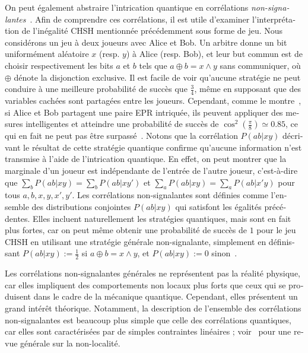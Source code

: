 \begin{otherlanguage}{french}
On peut également abstraire l'intrication quantique en corrélations \emph{non-signalantes}~\cite{Tsirelson80,PR94}. Afin de comprendre ces corrélations, il est utile d'examiner l'interprétation de l'inégalité CHSH mentionnée précédemment sous forme de jeu. Nous considérons un jeu à deux joueurs avec Alice et Bob. Un arbitre donne un bit uniformément aléatoire $x$ (resp. $y$) à Alice (resp. Bob), et leur but commun est de choisir respectivement les bits $a$ et $b$ tels que $a \oplus b = x \land y$ sans communiquer, où $\oplus$ dénote la disjonction exclusive. Il est facile de voir qu'aucune stratégie ne peut conduire à une meilleure probabilité de succès que $\frac{3}{4}$, même en supposant que des variables cachées sont partagées entre les joueurs. Cependant, comme le montre~\cite{CHSH69}, si Alice et Bob partagent une paire EPR intriquée, ils peuvent appliquer des mesures intelligentes et atteindre une probabilité de succès de $\cos^2\left(\frac{\pi}{8}\right) \simeq 0.85$, ce qui en fait ne peut pas être surpassé~\cite{Tsirelson80}. Notons que la corrélation $P(ab|xy)$ décrivant le résultat de cette stratégie quantique confirme qu'aucune information n'est transmise à l'aide de l'intrication quantique. En effet, on peut montrer que la marginale d'un joueur est indépendante de l'entrée de l'autre joueur, c'est-à-dire que $\sum_bP(ab|xy)=\sum_bP(ab|xy')$ et $\sum_aP(ab|xy)=\sum_aP(ab|x'y)$ pour tous $a,b,x,y,x',y'$. Les corrélations non-signalantes sont définies comme l'ensemble des distributions conjointes $P(ab|xy)$ qui satisfont les égalités précédentes. Elles incluent naturellement les stratégies quantiques, mais sont en fait plus fortes, car on peut même obtenir une probabilité de succès de $1$ pour le jeu CHSH en utilisant une stratégie générale non-signalante, simplement en définissant $P(ab|xy):=\frac{1}{2}$ si $a \oplus b = x \land y$, et $P(ab|xy):=0$ sinon~\cite{PR94}.

Les corrélations non-signalantes générales ne représentent pas la réalité physique, car elles impliquent des comportements non locaux plus forts que ceux qui se produisent dans le cadre de la mécanique quantique. Cependant, elles présentent un grand intérêt théorique. Notamment, la description de l'ensemble des corrélations non-signalantes est beaucoup plus simple que celle des corrélations quantiques, car elles sont caractérisées par de simples contraintes linéaires ; voir~\cite{BCPSW14} pour une revue générale sur la non-localité.


\end{otherlanguage}
